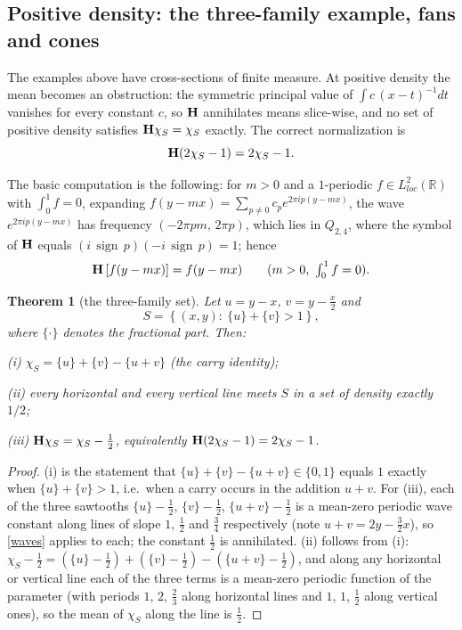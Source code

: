 \documentclass{article}
\newcommand{\tmop}[1]{\ensuremath{\operatorname{#1}}}
\newtheorem{theorem}{Theorem}
\def\H{{\bf H}}
\def\R{{\mathbb R}}
\begin{document}
	\subsection{Positive density: the three-family example, fans and cones}

	The examples above have cross-sections of finite measure. At positive density the mean becomes an obstruction: the symmetric principal value of $\int c\,(x-t)^{-1}dt$ vanishes for every constant $c$, so $\H$ annihilates means slice-wise, and no set of positive density satisfies $\H\chi_S=\chi_S$ exactly. The correct normalization is
	$$\H(2\chi_S-1)=2\chi_S-1 .$$

	The basic computation is the following: for $m>0$ and a $1$-periodic $f\in L^2_{loc}(\R)$ with $\int_0^1f=0$, expanding $f(y-mx)=\sum_{p\neq 0}c_pe^{2\pi ip(y-mx)}$, the wave $e^{2\pi ip(y-mx)}$ has frequency $(-2\pi pm,\,2\pi p)$, which lies in $Q_{2,4}$, where the symbol of $\H$ equals $(i\,\tmop{sign}\, p)(-i\,\tmop{sign}\,p)=1$; hence
	\begin{equation}\label{waves}
		\H\left[f(y-mx)\right]=f(y-mx)\qquad(m>0,\ \textstyle\int_0^1 f=0).
	\end{equation}

	\begin{theorem}[the three-family set]\label{Tcarry}
		Let $u=y-x$, $v=y-\frac x2$ and
		$$S=\left\{(x,y):\ \{u\}+\{v\}>1\right\},$$
		where $\{\cdot\}$ denotes the fractional part. Then:

		(i) $\chi_S=\{u\}+\{v\}-\{u+v\}$ (the carry identity);

		(ii) every horizontal and every vertical line meets $S$ in a set of density exactly $1/2$;

		(iii) $\H\chi_S=\chi_S-\frac 12$, equivalently $\H(2\chi_S-1)=2\chi_S-1$.
	\end{theorem}

	\begin{proof}
		(i) is the statement that $\{u\}+\{v\}-\{u+v\}\in\{0,1\}$ equals $1$ exactly when $\{u\}+\{v\}>1$, i.e.\ when a carry occurs in the addition $u+v$. For (iii), each of the three sawtooths $\{u\}-\frac12$, $\{v\}-\frac 12$, $\{u+v\}-\frac12$ is a mean-zero periodic wave constant along lines of slope $1$, $\frac 12$ and $\frac 34$ respectively (note $u+v=2y-\frac 32 x$), so \eqref{waves} applies to each; the constant $\frac 12$ is annihilated. (ii) follows from (i): $\chi_S-\frac12=(\{u\}-\frac12)+(\{v\}-\frac12)-(\{u+v\}-\frac12)$, and along any horizontal or vertical line each of the three terms is a mean-zero periodic function of the parameter (with periods $1$, $2$, $\frac23$ along horizontal lines and $1$, $1$, $\frac12$ along vertical ones), so the mean of $\chi_S$ along the line is $\frac12$.
	\end{proof}
\end{document}
